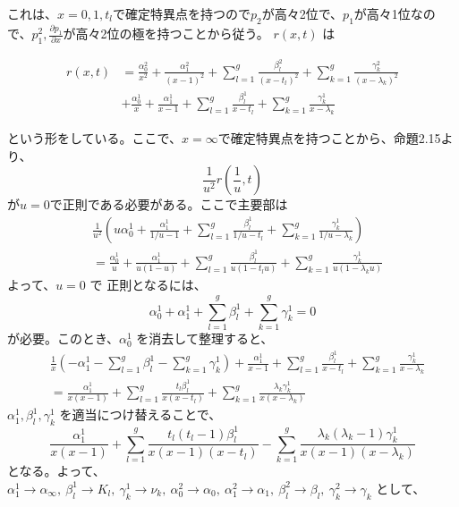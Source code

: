 \begin{story}
これは、$x=0,1,t_{l}$で確定特異点を持つので$p_{2}$が高々2位で、$p_{1}$が高々1位なので、$p_{1}^{2},\frac{\partial p_{1}}{\partial x}$が高々2位の極を持つことから従う。
$r(x,t)$ は

\begin{align}
    r(x,t) &= \frac{\alpha_0^{2}}{x^2} + \frac{\alpha_1^{2}}{(x-1)^2} +\sum_{l=1}^g \frac{\beta_l^{2}}{(x-t_l)^2}+\sum_{k=1}^g\frac{\gamma_{k}^{2}}{(x-\lambda_k)^2} \nonumber\\
    &+\frac{\alpha_{0}^{1}}{x} + \frac{\alpha_{1}^{1}}{x-1} + \sum_{l=1}^g  \frac{\beta_l^{1}}{x-t_l}+ \sum_{k=1}^g \frac{\gamma_{k}^{1}}{x-\lambda_k} 
\end{align}

という形をしている。ここで、$x=\infty$で確定特異点を持つことから、命題2.15より、
\[
\frac{1}{u^{2}}r\left(\frac{1}{u},t\right)
\]
が$u=0$で正則である必要がある。ここで主要部は
\begin{align*}
    & \frac{1}{u^2} \left( u\alpha_0^{1} + \frac{\alpha_1^{1}}{1/u - 1} + \sum_{l=1}^g \frac{\beta_l^{1}}{1/u - t_l} + \sum_{k=1}^g \frac{\gamma_k^{1}}{1/u - \lambda_k} \right) \\
    &= \frac{\alpha_0^{1}}{u} + \frac{\alpha_1^{1}}{u(1-u)} + \sum_{l=1}^g \frac{\beta_l^{1}}{u(1-t_l u)} + \sum_{k=1}^g \frac{\gamma_k^{1}}{u(1-\lambda_k u)}
\end{align*}
よって、$u=0$ で 正則となるには、
\begin{equation*}
    \alpha_0^{1} + \alpha_1^{1} + \sum_{l=1}^g \beta_l^{1} + \sum_{k=1}^g \gamma_k^{1} = 0
\end{equation*}
が必要。このとき、$\alpha_0^{1}$ を消去して整理すると、
\begin{align*}
    & \frac{1}{x} \left( -\alpha_1^{1} - \sum_{l=1}^g \beta_l^{1} - \sum_{k=1}^g \gamma_k^{1} \right) + \frac{\alpha_1^{1}}{x-1} + \sum_{l=1}^g \frac{\beta_l^{1}}{x-t_l} + \sum_{k=1}^g \frac{\gamma_k^{1}}{x-\lambda_k} \\
    &= \frac{\alpha_1^{1}}{x(x-1)} + \sum_{l=1}^g \frac{t_l \beta_l^{1}}{x(x-t_l)} + \sum_{k=1}^g \frac{\lambda_k \gamma_k^{1}}{x(x-\lambda_k)}
\end{align*}
$\alpha_1^{1}, \beta_l^1, \gamma_k^1$ を適当につけ替えることで、
\begin{equation*}
    \frac{\alpha_1^1}{x(x-1)} + \sum_{l=1}^g \frac{t_l(t_l-1)\beta_l^1}{x(x-1)(x-t_l)} - \sum_{k=1}^g \frac{\lambda_k(\lambda_k-1)\gamma_k^1}{x(x-1)(x-\lambda_k)}
\end{equation*}
となる。よって、$\alpha_1^1 \to \alpha_\infty, \ \beta_l^1 \to K_l, \ \gamma_k^1 \to \nu_k, \ \alpha_0^2 \to \alpha_0, \ \alpha_1^2 \to \alpha_1, \ \beta_l^2 \to \beta_l, \ \gamma_k^2 \to \gamma_k$ として、


\end{story}
